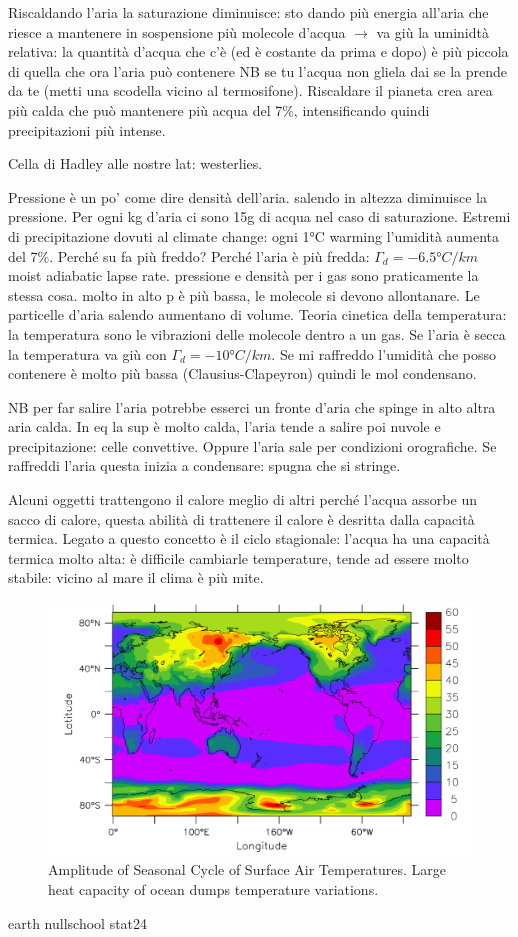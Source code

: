 Riscaldando l'aria la saturazione diminuisce: sto dando più energia all'aria che riesce a mantenere in sospensione più molecole d'acqua $\rightarrow$ va giù la uminidtà relativa: la quantità d'acqua che c'è (ed è costante da prima e dopo) è più piccola di quella che ora l'aria può contenere NB se tu l'acqua non gliela dai se la prende da te (metti una scodella vicino al termosifone). 
Riscaldare il pianeta crea area più calda che può mantenere più acqua del 7\%, intensificando quindi precipitazioni più intense.


Cella di Hadley alle nostre lat: westerlies.

Pressione è un po' come dire densità dell'aria. salendo in altezza diminuisce la pressione. 
Per ogni kg d'aria ci sono 15g di acqua nel caso di saturazione. Estremi di precipitazione dovuti al climate change: ogni 1°C warming l'umidità aumenta del 7\%. Perché su fa più freddo? Perché l'aria è più fredda: $\Gamma_d=-6.5°C/km$ moist adiabatic lapse rate. pressione e densità per i gas sono praticamente la stessa cosa.  molto in alto p è più bassa, le molecole si devono allontanare. Le particelle d'aria salendo aumentano di volume. Teoria cinetica della temperatura: la temperatura sono le vibrazioni delle molecole dentro a un gas. Se l'aria è secca la temperatura va giù con $\Gamma_d=-10°C/km$. Se mi raffreddo l'umidità che posso contenere è molto più bassa (Clausius-Clapeyron) quindi le mol condensano. 

NB per far salire l'aria potrebbe esserci un fronte d'aria che spinge in alto altra aria calda. In eq la sup è molto calda, l'aria tende a salire poi nuvole e precipitazione: celle convettive. Oppure l'aria sale per condizioni orografiche. Se raffreddi l'aria questa inizia a condensare: spugna che si stringe.


Alcuni oggetti trattengono il calore meglio di altri perché l'acqua assorbe un sacco di calore, questa abilità di trattenere il calore è desritta dalla capacità termica. Legato a questo concetto è il ciclo stagionale: l'acqua ha una capacità termica molto alta: è difficile cambiarle temperature, tende ad essere molto stabile: vicino al mare il clima è più mite.
\begin{figure}[htpb]
    \centering
    \includegraphics[width=0.5\linewidth]{uploads/Seasonal Cycle.png}
    \caption{Amplitude of Seasonal Cycle of Surface Air Temperatures. Large heat capacity of ocean dumps temperature variations.}
\end{figure}
earth nullschool
stat24



